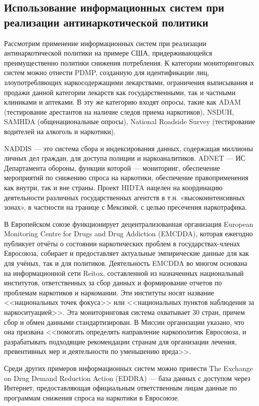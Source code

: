 \documentclass[a4paper,14pt]{article}
\begin{document}
\subsection{Использование информационных систем при реализации антинаркотической политики}

Рассмотрим применение информационных систем при реализации антинаркотической политики на примере США, придерживающейся преимущественно политики снижения потребления. К категории мониторинговых систем можно отнести PDMP, созданную для идентификации лиц, злоупотребляющих наркосодержащими лекарствами, ограничения выписывания и продажи данной категории лекарств как государственными, так и частными клиниками и аптеками. В эту же категорию входят опросы, такие как ADAM (тестирование арестантов на наличие следов приема наркотиков), NSDUH, SAMHDA (общенациональные опросы),  National Roadside Survey (тестирование водителей на алкоголь и наркотики). 

NADDIS — это система сбора и индексирования данных, содержащая миллионы личных дел граждан, для доступа полиции и наркоаналитиков. ADNET — ИС Департамента обороны, функции которой — мониторинг, обеспечение мероприятий по снижению спроса на наркотики, обеспечение правоприменения как внутри, так и вне страны. Проект HIDTA нацелен на координацию деятельности различных государственных агентств в т.н. «высокоинтенсивных зонах», в частности на границе с Мексикой, с целью пресечения наркотрафика.

В Европейском союзе функционирует децентрализованная организация European Monitoring Centre for Drugs and Drug Addiction (EMCDDA), которая ежегодно публикует отчёты о состоянии наркотических проблем в государствах-членах Евросоюза, собирает и предоставляет актуальные эмпирические данные для как для учёных, так и для политиков. Деятельность EMCDDA во многом основана на информационной сети Reitox, составленной из назначенных национальный институтов, ответственных за сбор данных и формирование отчетов по проблемам наркотиков и наркомании.  Эти институты носят название <<национальных точек фокуса>> или <<национальных пунктов наблюдения за наркоситуацией>>. Эта мониторинговая система охватывает 30 стран, причем сбор и обмен данными стандартизирован. В Миссии организации указано, что она призвана <<помогать определять направление наркополитик Евросоюза, и разрабатывать подходящие рекомендации странам для организации лечения, превентивных мер и деятельности по уменьшению вреда>>.

Среди других примеров информационных систем можно привести The Exchange on Drug Demand Reduction Action (EDDRA) --- база данных с доступом через Интернет, предоставляющая официальным ответственным лицам данные по программам снижения спроса на наркотики в Евросоюзе.
\end{document}
